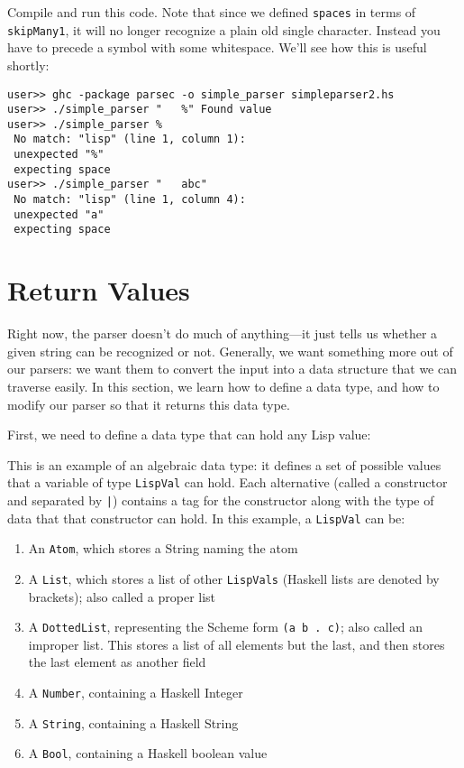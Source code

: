  
Compile and run this code. Note that since we defined \verb|spaces| in terms of \lstinline|skipMany1|, it will no longer recognize a plain old single character. Instead you have to precede a symbol with some whitespace. We'll see how this is useful shortly:
 
\begin{lstlisting}[language=shell,numbers=none,nolol]
user>> ghc -package parsec -o simple_parser simpleparser2.hs
user>> ./simple_parser "   %" Found value
user>> ./simple_parser %
 No match: "lisp" (line 1, column 1):
 unexpected "%"
 expecting space
user>> ./simple_parser "   abc"
 No match: "lisp" (line 1, column 4):
 unexpected "a"
 expecting space
\end{lstlisting}
 
\section{Return Values}
 
Right now, the parser doesn't do much of anything---it just tells us whether a given string can be recognized or not. Generally, we want something more out of our parsers: we want them to convert the input into a data structure that we can traverse easily. In this section, we learn how to define a data type, and how to modify our parser so that it returns this data type.
 
First, we need to define a data type that can hold any Lisp value:
 
 
This is an example of an algebraic data type: it defines a set of possible values that a variable of type \verb|LispVal| can hold. Each alternative (called a constructor and separated by \lstinline!|!) contains a tag for the constructor along with the type of data that that constructor can hold. In this example, a \verb|LispVal| can be:
 
\begin{enumerate}
 \item An \verb|Atom|, which stores a String naming the atom
 \item A \verb|List|, which stores a list of other \verb|LispVals| (Haskell lists are denoted by brackets); also called a proper list
 \item A \verb|DottedList|, representing the Scheme form \lstinline|(a b . c)|; also called an improper list. This stores a list of all elements but the last, and then stores the last element as another field
 \item A \verb|Number|, containing a Haskell Integer
 \item A \verb|String|, containing a Haskell String
 \item A \verb|Bool|, containing a Haskell boolean value
\end{enumerate}
 
